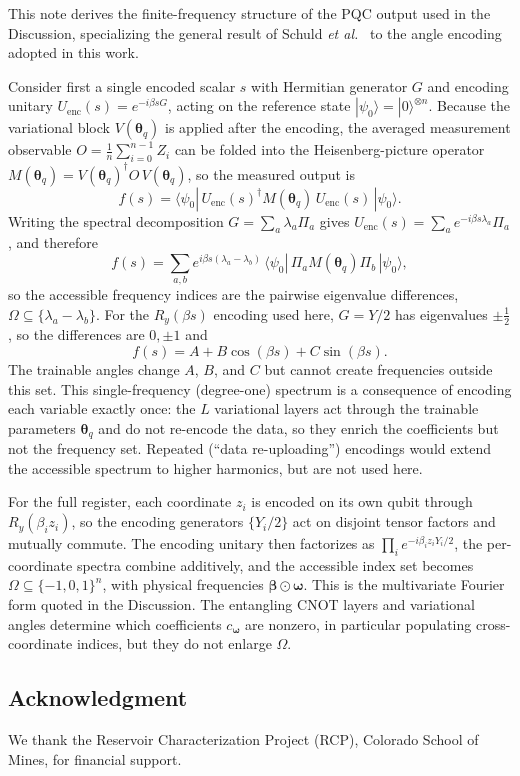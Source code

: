 This note derives the finite-frequency structure of the PQC output used in the Discussion, specializing the general result of Schuld \emph{et al.}~\cite{schuld2021effect} to the angle encoding adopted in this work.

Consider first a single encoded scalar $s$ with Hermitian generator $G$ and encoding unitary $U_{\mathrm{enc}}(s)=e^{-i\beta s G}$, acting on the reference state $|\psi_0\rangle=|0\rangle^{\otimes n}$. Because the variational block $V(\boldsymbol{\theta}_q)$ is applied after the encoding, the averaged measurement observable $O=\frac{1}{n}\sum_{i=0}^{n-1}Z_i$ can be folded into the Heisenberg-picture operator $M(\boldsymbol{\theta}_q)=V(\boldsymbol{\theta}_q)^\dagger O\,V(\boldsymbol{\theta}_q)$, so the measured output is
\begin{equation}
  f(s)=\langle\psi_0|\,U_{\mathrm{enc}}(s)^\dagger M(\boldsymbol{\theta}_q)\,U_{\mathrm{enc}}(s)\,|\psi_0\rangle.
\end{equation}
Writing the spectral decomposition $G=\sum_a \lambda_a \Pi_a$ gives $U_{\mathrm{enc}}(s)=\sum_a e^{-i\beta s\lambda_a}\Pi_a$, and therefore
\begin{equation}
  f(s)=\sum_{a,b} e^{i\beta s(\lambda_a-\lambda_b)}\,\langle\psi_0|\,\Pi_a M(\boldsymbol{\theta}_q)\Pi_b\,|\psi_0\rangle,
\end{equation}
so the accessible frequency indices are the pairwise eigenvalue differences, $\Omega\subseteq\{\lambda_a-\lambda_b\}$. For the $R_y(\beta s)$ encoding used here, $G=Y/2$ has eigenvalues $\pm\tfrac{1}{2}$, so the differences are $0,\pm 1$ and
\begin{equation}
  f(s)=A+B\cos(\beta s)+C\sin(\beta s).
\end{equation}
The trainable angles change $A$, $B$, and $C$ but cannot create frequencies outside this set. This single-frequency (degree-one) spectrum is a consequence of encoding each variable exactly once: the $L$ variational layers act through the trainable parameters $\boldsymbol{\theta}_q$ and do not re-encode the data, so they enrich the coefficients but not the frequency set. Repeated (``data re-uploading'') encodings would extend the accessible spectrum to higher harmonics, but are not used here.

For the full register, each coordinate $z_i$ is encoded on its own qubit through $R_y(\beta_i z_i)$, so the encoding generators $\{Y_i/2\}$ act on disjoint tensor factors and mutually commute. The encoding unitary then factorizes as $\prod_i e^{-i\beta_i z_i Y_i/2}$, the per-coordinate spectra combine additively, and the accessible index set becomes $\Omega\subseteq\{-1,0,1\}^n$, with physical frequencies $\boldsymbol{\beta}\odot\boldsymbol{\omega}$. This is the multivariate Fourier form quoted in the Discussion. The entangling CNOT layers and variational angles determine which coefficients $c_{\boldsymbol{\omega}}$ are nonzero, in particular populating cross-coordinate indices, but they do not enlarge $\Omega$.

\subsection{Acknowledgment}

We thank the Reservoir Characterization Project (RCP), Colorado School of Mines, for financial support.
